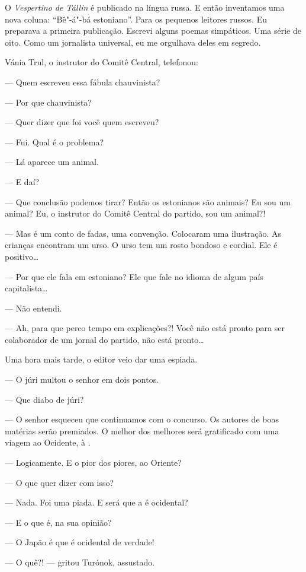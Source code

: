 O \emph{Vespertino de Tállin} é publicado na língua russa. E então
inventamos uma nova coluna: ``Bê"-á"-bá estoniano''. Para os pequenos
leitores russos. Eu preparava a primeira publicação. Escrevi alguns
poemas simpáticos. Uma série de oito. Como um jornalista universal, eu
me orgulhava deles em segredo.

Vánia Trul, o instrutor do Comitê Central, telefonou:

--- Quem escreveu essa fábula chauvinista?

--- Por que chauvinista?

--- Quer dizer que foi você quem escreveu?

--- Fui. Qual é o problema?

--- Lá aparece um animal.

--- E daí?

--- Que conclusão podemos tirar? Então os estonianos são animais? Eu sou
um animal? Eu, o instrutor do Comitê Central do partido, sou um animal?!

--- Mas é um conto de fadas, uma convenção. Colocaram uma ilustração. As
crianças encontram um urso. O urso tem um rosto bondoso e cordial. Ele é
positivo\ldots{}

--- Por que ele fala em estoniano? Ele que fale no idioma de algum país
capitalista\ldots{}

--- Não entendi.

--- Ah, para que perco tempo em explicações?! Você não está pronto para
ser colaborador de um jornal do partido, não está pronto\ldots{}

Uma hora mais tarde, o editor veio dar uma espiada.

--- O júri multou o senhor em dois pontos.

--- Que diabo de júri?

--- O senhor esqueceu que continuamos com o concurso. Os autores de boas
matérias serão premiados. O melhor dos melhores será gratificado com uma
viagem ao Ocidente, à .

--- Logicamente. E o pior dos piores, ao Oriente?

--- O que quer dizer com isso?

--- Nada. Foi uma piada. E será que a  é ocidental?

--- E o que é, na sua opinião?

--- O Japão é que é ocidental de verdade!

--- O quê?! --- gritou Turónok, assustado.

